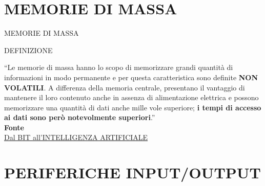 \documentclass[aspectratio=1610]{beamer}
\begin{document}
\section{MEMORIE DI MASSA}

\begin{frame}{MEMORIE DI MASSA}
    \begin{alertblock}{DEFINIZIONE}
        \begin{minipage}{0.98\linewidth}
            \justifying
            ``Le memorie di massa hanno lo scopo di memorizzare grandi quantità di informazioni in modo 
            permanente e per questa caratteristica sono definite \textbf{NON VOLATILI}. A differenza della 
            memoria centrale, presentano il vantaggio di mantenere il loro contenuto anche in assenza di 
            alimentazione elettrica e possono memorizzare una quantità di dati anche mille vole superiore; 
            \textbf{i tempi di accesso ai dati sono però notevolmente superiori}.''\\
            \bigskip
            \tiny{\textbf{Fonte}}\\
            \tiny{\href{https://catalogo.sanoma.it/si-op-104157-dal-bit-all-intelligenza-artificiale.html}{Dal BIT all'INTELLIGENZA ARTIFICIALE}}
        \end{minipage}
    \end{alertblock}
\end{frame}

\section{PERIFERICHE INPUT/OUTPUT}
\end{document}
